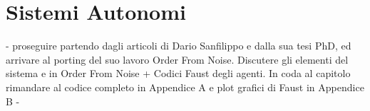 \section{Sistemi Autonomi}
\label{sec:Sistemi Autonomi}

- proseguire partendo dagli articoli di Dario Sanfilippo e dalla sua tesi PhD,
ed arrivare al porting del suo lavoro Order From Noise.
Discutere gli elementi del sistema e in Order From Noise +
Codici Faust degli agenti.
In coda al capitolo rimandare al codice completo in Appendice A e plot
grafici di Faust in Appendice B -
